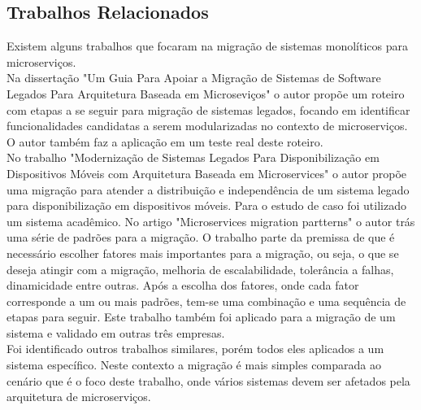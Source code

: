 \documentclass[12pt]{article}
\begin{document}
\subsection{Trabalhos Relacionados}
Existem alguns trabalhos que focaram na migração de sistemas monolíticos para microserviços.
\\Na dissertação "Um Guia Para Apoiar a Migração de Sistemas de Software Legados Para Arquitetura Baseada em Microseviços"\hspace{0.05cm} o autor propõe um roteiro com etapas a se seguir para migração de sistemas legados, focando em identificar funcionalidades candidatas a serem modularizadas no contexto de microserviços. O autor também faz a aplicação em um teste real deste roteiro.
\\No trabalho "Modernização de Sistemas Legados Para Disponibilização em Dispositivos Móveis com Arquitetura Baseada em Microservices" o autor propõe uma migração para atender a distribuição e independência de um sistema legado para disponibilização em dispositivos móveis. Para o estudo de caso foi utilizado um sistema acadêmico.
No artigo "Microservices migration partterns" o autor \cite{Balalaie2018} trás uma série de padrões para a migração. O trabalho parte da premissa de que é necessário escolher fatores mais importantes para a migração, ou seja, o que se deseja atingir com a migração, melhoria de escalabilidade, tolerância a falhas, dinamicidade entre outras. Após a escolha dos fatores, onde cada fator corresponde a um ou mais padrões, tem-se uma combinação e uma sequência de etapas para seguir. Este trabalho também foi aplicado para a migração de um sistema e validado em outras três empresas.
\\Foi identificado outros trabalhos similares, porém todos eles aplicados a um sistema específico. Neste contexto a migração é mais simples comparada ao cenário que é o foco deste trabalho, onde vários sistemas devem ser afetados pela arquitetura de microserviços.
\end{document}
